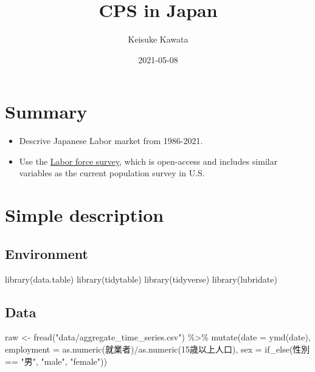 \documentclass[
]{book}
\title{CPS in Japan}
\author{Keisuke Kawata}
\date{2021-05-08}
\newenvironment{Shaded}{\begin{snugshade}}{\end{snugshade}}
\newcommand{\AttributeTok}[1]{\textcolor[rgb]{0.77,0.63,0.00}{#1}}
\newcommand{\FunctionTok}[1]{\textcolor[rgb]{0.00,0.00,0.00}{#1}}
\newcommand{\NormalTok}[1]{#1}
\newcommand{\OtherTok}[1]{\textcolor[rgb]{0.56,0.35,0.01}{#1}}
\newcommand{\SpecialCharTok}[1]{\textcolor[rgb]{0.00,0.00,0.00}{#1}}
\newcommand{\StringTok}[1]{\textcolor[rgb]{0.31,0.60,0.02}{#1}}
\begin{document}
\maketitle

{
\setcounter{tocdepth}{1}
\tableofcontents
}
\hypertarget{summary}{%
\chapter{Summary}\label{summary}}

\begin{itemize}
\item
  Descrive Japanese Labor market from 1986-2021.
\item
  Use the \href{https://www.stat.go.jp/english/data/roudou/index.html}{Labor force survey}, which is open-access and includes similar variables as the current population survey in U.S.
\end{itemize}

\hypertarget{intro}{%
\chapter{Simple description}\label{intro}}

\hypertarget{environment}{%
\section{Environment}\label{environment}}

\begin{Shaded}
\begin{Highlighting}[]
\FunctionTok{library}\NormalTok{(data.table)}
\FunctionTok{library}\NormalTok{(tidytable)}
\FunctionTok{library}\NormalTok{(tidyverse)}
\FunctionTok{library}\NormalTok{(lubridate)}
\end{Highlighting}
\end{Shaded}

\hypertarget{data}{%
\section{Data}\label{data}}

\begin{Shaded}
\begin{Highlighting}[]
\NormalTok{raw }\OtherTok{\textless{}{-}} 
  \FunctionTok{fread}\NormalTok{(}\StringTok{"data/aggregate\_time\_series.csv"}\NormalTok{) }\SpecialCharTok{\%\textgreater{}\%}
  \FunctionTok{mutate}\NormalTok{(}\AttributeTok{date =} \FunctionTok{ymd}\NormalTok{(date),}
         \AttributeTok{employment =} \FunctionTok{as.numeric}\NormalTok{(就業者)}\SpecialCharTok{/}\FunctionTok{as.numeric}\NormalTok{(}\StringTok{\textasciigrave{}}\AttributeTok{15歳以上人口}\StringTok{\textasciigrave{}}\NormalTok{),}
         \AttributeTok{sex =} \FunctionTok{if\_else}\NormalTok{(性別 }\SpecialCharTok{==} \StringTok{"男"}\NormalTok{, }\StringTok{"male"}\NormalTok{, }\StringTok{"female"}\NormalTok{))}
\end{Highlighting}
\end{Shaded}
\end{document}
